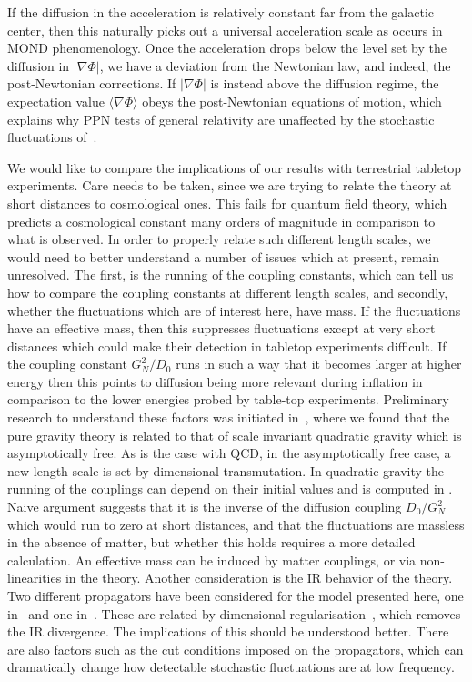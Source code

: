 \documentclass[aps,pra,amsmath,amssymb,amsthm,floatfix,nofootinbib,notitlepage,superscriptaddress,10pt]{revtex4-2}
\begin{document}
If the diffusion in the acceleration is relatively constant far from the galactic center, then this naturally picks out a universal acceleration scale as occurs in MOND phenomenology. Once the acceleration drops below the level set by the diffusion in $|\nabla\Phi|$, we have a deviation from the Newtonian law, and indeed, the post-Newtonian corrections. If $|\nabla\Phi|$ is instead above the diffusion regime, the expectation value $\langle\nabla\Phi\rangle$ obeys the post-Newtonian equations of motion, which explains why PPN tests of general relativity are unaffected by the stochastic fluctuations of~\cite{oppenheim2018post,oppenheim2023covariant}.

We would like to compare the implications of our results with terrestrial tabletop experiments. Care needs to be taken, since we are trying to relate the theory at short distances to cosmological ones.  This fails for quantum field theory, which predicts a cosmological constant many orders of magnitude in comparison to what is observed. 
In order to properly relate such different length scales, we would need to better understand a number of issues which at present, remain unresolved. 
The first, is the running of the coupling constants, which can tell us how to compare the coupling constants at different length scales, and secondly, whether the fluctuations which are of interest here, have mass. If the fluctuations have an effective mass, then this suppresses fluctuations except at very short distances which could make their detection in tabletop experiments difficult. If the coupling constant $G_N^2/D_0$ runs in such a way that it becomes larger at higher energy then this points to diffusion being more relevant during inflation in comparison to the lower energies probed by table-top experiments. Preliminary research to understand these factors was initiated in~\cite{grudka2023renormalisable},
where we found that the pure gravity theory is related to that of scale invariant quadratic gravity which is asymptotically free. As is the case with QCD, in the asymptotically free case, a new length scale is set by dimensional transmutation. In quadratic gravity the running of the couplings can depend on their initial values and is computed in \cite{julve19781978quantum,fradkin1981renormalizable,benedetti2009asymtotic,buccio2024physical}. Naive argument suggests that it is the inverse of the diffusion coupling $D_0/G_N^2$ which would run to zero at short distances, and that the fluctuations are massless in the absence of matter, but whether this holds requires a more detailed calculation. An effective mass can be induced by matter couplings, or via non-linearities in the theory.
Another consideration is the IR behavior of the theory. Two different propagators have been considered for the model presented here, one in~\cite{oppenheim2023gravitationally} and one in~\cite{grudka2023renormalisable}. These are related by dimensional regularisation~\cite{morris2024dim}, which removes the IR divergence. The implications of this should be understood better. There are also factors such as the cut conditions imposed on the propagators, which can dramatically change how detectable stochastic fluctuations are at low frequency.
 
\end{document}
